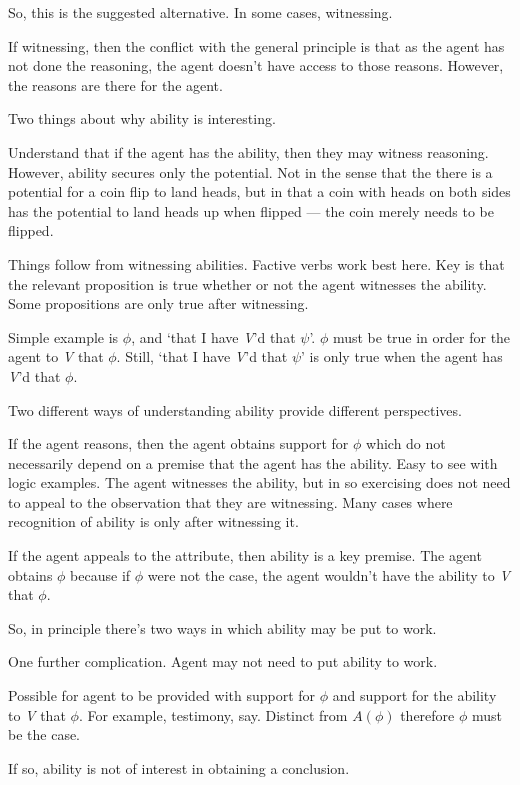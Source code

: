 \documentclass[10pt]{article}
\begin{document}
So, this is the suggested alternative.
In some cases, witnessing.

If witnessing, then the conflict with the general principle is that as the agent has not done the reasoning, the agent doesn't have access to those reasons.
However, the reasons are there for the agent.

Two things about why ability is interesting.

Understand that if the agent has the ability, then they may witness reasoning.
However, ability secures only the potential.
Not in the sense that the there is a potential for a coin flip to land heads, but in that a coin with heads on both sides has the potential to land heads up when flipped --- the coin merely needs to be flipped.

Things follow from witnessing abilities.
Factive verbs work best here.
Key is that the relevant proposition is true whether or not the agent witnesses the ability.
Some propositions are only true after witnessing.

Simple example is \(\phi\), and `that I have \emph{V}'d that \(\psi\)'.
\(\phi\) must be true in order for the agent to \emph{V} that \(\phi\).
Still, `that I have \emph{V}'d that \(\psi\)' is only true when the agent has \emph{V}'d that \(\phi\).

Two different ways of understanding ability provide different perspectives.

If the agent reasons, then the agent obtains support for \(\phi\) which do not necessarily depend on a premise that the agent has the ability.
Easy to see with logic examples.
The agent witnesses the ability, but in so exercising does not need to appeal to the observation that they are witnessing.
Many cases where recognition of ability is only after witnessing it.

If the agent appeals to the attribute, then ability is a key premise.
The agent obtains \(\phi\) because if \(\phi\) were not the case, the agent wouldn't have the ability to \emph{V} that \(\phi\).

So, in principle there's two ways in which ability may be put to work.

One further complication.
Agent may not need to put ability to work.

Possible for agent to be provided with support for \(\phi\) and support for the ability to \emph{V} that \(\phi\).
For example, testimony, say.
Distinct from \(A(\phi)\) therefore \(\phi\) must be the case.

If so, ability is not of interest in obtaining a conclusion.
\end{document}
